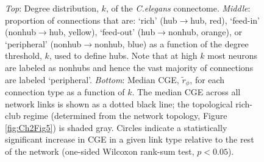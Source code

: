 \begin{figure}[!h]
{\emph{Top}: Degree distribution, $k$, of the \emph{C.elegans} connectome.
\emph{Middle}: proportion of connections that are:
`rich' (hub$\rightarrow$hub, red),
`feed-in' (nonhub$\rightarrow$hub, yellow),
`feed-out' (hub$\rightarrow$nonhub, orange), or
`peripheral' (nonhub$\rightarrow$nonhub, blue) as a function of the degree threshold, $k$, used to define hubs.
Note that at high $k$ most neurons are labeled as nonhubs and hence the vast majority of connections are labeled `peripheral'.
 \emph{Bottom}: Median CGE, $\tilde{r}_\phi$, for each connection type as a function of $k$.
The median CGE across all network links is shown as a dotted black line; the topological rich-club regime (determined from the network topology, Figure \ref{fig:Ch2Fig5}) is shaded gray.
Circles indicate a statistically significant increase in CGE in a given link type relative to the rest of the network (one-sided Wilcoxon rank-sum test, $p < 0.05$).
}
 \label{fig:Ch2Fig6}
\end{figure}

